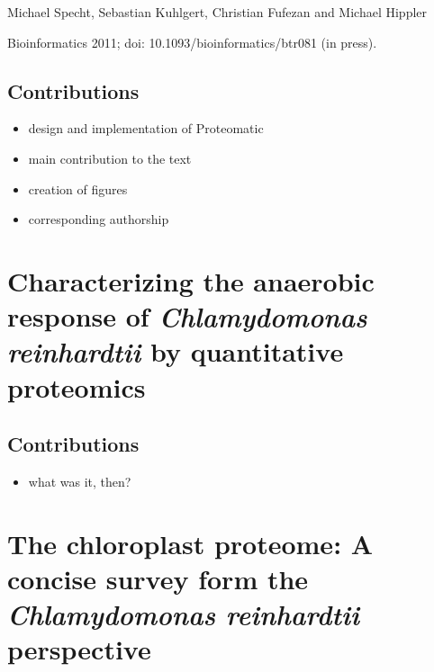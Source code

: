 \documentclass[11pt,a4paper,twoside]{report}
\newcommand{\includepublication}[1]{}
\begin{document}
Michael Specht, Sebastian Kuhlgert, Christian Fufezan and Michael Hippler

Bioinformatics 2011; doi: 10.1093/bioinformatics/btr081 (in press).

\subsection*{Contributions}

\begin{itemize}
\item design and implementation of Proteomatic
\item main contribution to the text
\item creation of figures
\item corresponding authorship
\end{itemize}

\includepublication{publications/proteomatic-2011.pdf}

\cleardoublepage
\section{Characterizing the anaerobic response of {\em Chlamydomonas reinhardtii} by quantitative proteomics}

\subsection*{Contributions}

\begin{itemize}
\item what was it, then?
\end{itemize}

\includepublication{publications/terashima-2010.pdf}

\cleardoublepage
\section{The chloroplast proteome: A concise survey form the {\em Chlamydomonas reinhardtii} perspective}
\end{document}
